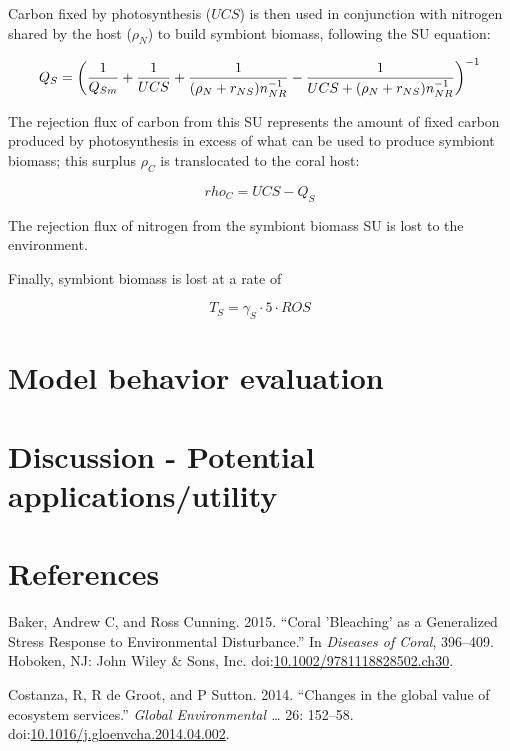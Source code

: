\documentclass[]{elsarticle} %
\begin{document}
Carbon fixed by photosynthesis (\(UCS\)) is then used in conjunction
with nitrogen shared by the host (\(\rho_N\)) to build symbiont biomass,
following the SU equation:

\begin{equation} Q_S = \bigg({1 \over Q_{Sm}} + {1 \over UCS} + {1 \over {(\rho_N + r_{NS})n_{NR}^{-1}}} - {1 \over {UCS + (\rho_N + r_{NS})n_{NR}^{-1}}}\bigg)^{-1} \end{equation}

The rejection flux of carbon from this SU represents the amount of fixed
carbon produced by photosynthesis in excess of what can be used to
produce symbiont biomass; this surplus \(\rho_C\) is translocated to the
coral host:

\begin{equation} rho_C = UCS - Q_S \end{equation}

The rejection flux of nitrogen from the symbiont biomass SU is lost to
the environment.

Finally, symbiont biomass is lost at a rate of

\begin{equation} T_S = \gamma_S \cdot 5 \cdot ROS \end{equation}

\section{Model behavior evaluation}\label{model-behavior-evaluation}

\section{Discussion - Potential
applications/utility}\label{discussion---potential-applicationsutility}

\section*{References}\label{references}

\hypertarget{refs}{}
\hypertarget{ref-Baker:2015kp}{}
Baker, Andrew C, and Ross Cunning. 2015. ``Coral 'Bleaching' as a
Generalized Stress Response to Environmental Disturbance.'' In
\emph{Diseases of Coral}, 396--409. Hoboken, NJ: John Wiley \& Sons,
Inc.
doi:\href{https://doi.org/10.1002/9781118828502.ch30}{10.1002/9781118828502.ch30}.

\hypertarget{ref-Costanza:2014ex}{}
Costanza, R, R de Groot, and P Sutton. 2014. ``Changes in the global
value of ecosystem services.'' \emph{Global Environmental \ldots{}} 26:
152--58.
doi:\href{https://doi.org/10.1016/j.gloenvcha.2014.04.002}{10.1016/j.gloenvcha.2014.04.002}.
\end{document}
